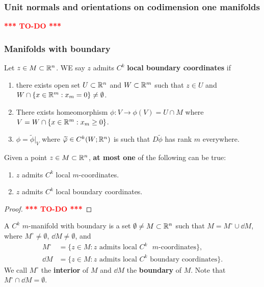 \documentclass[a4paper]{article}
\newcommand{\TODO}{\textcolor{red}{\textbf{*** TO-DO ***}}}
\begin{document}
\subsubsection{Unit normals and orientations on codimension 
one manifolds} 

\TODO

\subsubsection{Manifolds with boundary}

\begin{defi}
Let $z \in M \subset \mathbb{R}^n$. WE say $z$ admits $C^k$ \textbf{local 
boundary coordinates} if 
\begin{enumerate}
\item there exists open set $U \subset \mathbb{R}^n$ and $W \subset
\mathbb{R}^m$ such that $z \in U$ and $W \cap \{x \in \mathbb{R}^m : x_m = 0\}
\neq \emptyset$.

\item There exists homeomorphism $\phi: V \to \phi(V) = U \cap M$
where $V = W \cap \{x \in \mathbb{R}^m: x_m \geq 0\}$. 

\item $\phi = \tilde{\phi} \vert_V$ where $\widetilde{\varphi} \in C^k 
(W; \mathbb{R}^n)$ is such that $D \tilde{\phi}$ has rank $m$ everywhere.
\end{enumerate}
\end{defi}

\begin{prop}
Given a point $z \in M \subset \mathbb{R}^n$, \textbf{at most one}
of the following can be true: 
\begin{enumerate}
\item $z$ admits $C^k$ local $m$-coordinates.
\item $z$ admits $C^k$ local boundary coordinates.
\end{enumerate}
\end{prop}

\begin{proof}
\TODO
\end{proof}

\begin{defi}
A $C^k$ $m$-manifold with boundary is a set $\emptyset \neq
M \subset \mathbb{R}^n$ such that $M = M^\circ \cup \dd M$, 
where $M^\circ \neq \emptyset$, $\dd M \neq \emptyset$, and 
\[
\begin{aligned}
M^\circ &= \{z \in M : \text{$z$ admits local 
$C^k$ $m$-coordinates}\}, \\
\dd M &= \{z \in M : \text{$z$ admits local $C^k$ boundary
coordinates}\}.
\end{aligned}
\]
We call $M^\circ$ the \textbf{interior} of $M$ and $\dd M$
the \textbf{boundary} of $M$. Note that $M^\circ \cap \dd M 
= \emptyset$.
\end{defi}
\end{document}
